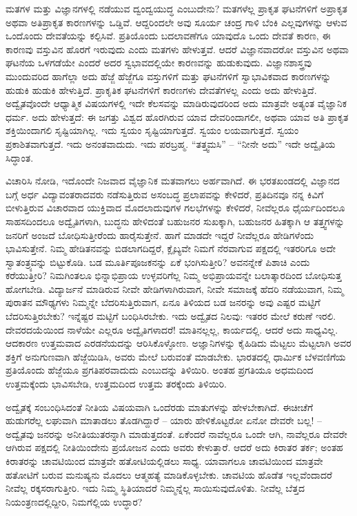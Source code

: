 ಮತಗಳ ಮತ್ತು ವಿಜ್ಞಾನಗಳಲ್ಲಿ ನಡೆಯುವ ದ್ವಂದ್ವಯುದ್ಧ ಎಂಬುದೇನು? ಮತಗಳೆಲ್ಲ ಪ್ರಾಕೃತ ಘಟನೆಗಳಿಗೆ ಅಪ್ರಾಕೃತ ಅಥವಾ ಅತಿಪ್ರಾಕೃತ ಕಾರಣಗಳನ್ನು ಒಡ್ಡಿವೆ. ಆದ್ದರಿಂದಲೇ ಅವು ಸೂರ್ಯ ಚಂದ್ರ ಗಾಳಿ ಬೆಂಕಿ ಎಲ್ಲವುಗಳನ್ನು ಆಳುವ ಒಂದೊಂದು ದೇವತೆಯನ್ನು ಕಲ್ಪಿಸಿವೆ. ಪ್ರತಿಯೊಂದು ಬದಲಾವಣೆಗೂ ಯಾವುದೊ ಒಂದು ದೇವತೆ ಕಾರಣ, ಈ ಕಾರಣವು ವಸ್ತುವಿನ ಹೊರಗೆ ಇರುವುದು ಎಂದು ಮತಗಳು ಹೇಳುತ್ತವೆ. ಆದರೆ ವಿಜ್ಞಾನವಾದರೋ ವಸ್ತುವಿನ ಅಥವಾ ಘಟನೆಯ ಒಳಗಡೆಯೇ ಎಂದರೆ ಅದರ ಸ್ವಭಾವದಲ್ಲಿಯೇ ಕಾರಣವನ್ನು ಹುಡುಕುವುದು. ವಿಜ್ಞಾನಶಾಸ್ತ್ರವು ಮುಂದುವರಿದ ಹಾಗೆಲ್ಲಾ ಅದು ಹೆಜ್ಜೆ ಹೆಜ್ಜೆಗೂ ವಸ್ತುಗಳಿಗೆ ಮತ್ತು ಘಟನೆಗಳಿಗೆ ಸ್ವಾಭಾವಿಕವಾದ ಕಾರಣಗಳನ್ನು ಹುಡುಕಿ ಹುಡುಕಿ ಹೇಳುತ್ತಿದೆ. ಪ್ರಾಕೃತಿಕ ಘಟನೆಗಳಿಗೆ ಕಾರಣಗಳು ದೇವತೆಗಳಲ್ಲ ಎಂದು ಅದು ಹೇಳುತ್ತಿದೆ. ಅದ್ವೈತವೊಂದೇ ಆಧ್ಯಾತ್ಮಿಕ ವಿಷಯಗಳಲ್ಲಿ ಇದೇ ಕೆಲಸವನ್ನು ಮಾಡಿರುವುದರಿಂದ ಅದು ಮಾತ್ರವೇ ಅತ್ಯಂತ ವೈಜ್ಞಾನಿಕ ಧರ್ಮ. ಅದು ಹೇಳುತ್ತದೆ: ಈ ಜಗತ್ತು ವಿಶ್ವದ ಹೊರಗಿರುವ ಯಾವ ದೇವರಿಂದಾಗಲೀ, ಅಥವಾ ಯಾವ ಅತಿ ಪ್ರಾಕೃತ ಶಕ್ತಿಯಿಂದಾಗಲಿ ಸೃಷ್ಟಿಯಾಗಿಲ್ಲ. ಇದು ಸ್ವಯಂ ಸೃಷ್ಟಿಯಾಗುತ್ತದೆ. ಸ್ವಯಂ ಲಯವಾಗುತ್ತದೆ. ಸ್ವಯಂ ಪ್ರಕಾಶಿತವಾಗುತ್ತದೆ. ಇದು ಅನಂತವಾದುದು. ಇದು ಪರಬ್ರಹ್ಮ. “ತತ್ತ್ವಮಸಿ” – “ನೀನೇ ಅದು” ಇದೇ ಅದ್ವೈತಿಯ ಸಿದ್ಧಾಂತ. 

ವಿಚಾರಿಸಿ ನೋಡಿ, ಇದೊಂದೇ ನಿಜವಾದ ವೈಜ್ಞಾನಿಕ ಮತವಾಗಲು ಅರ್ಹವಾಗಿದೆ. ಈ ಭರತಖಂಡದಲ್ಲಿ ವಿಜ್ಞಾನದ ಬಗ್ಗೆ ಅರ್ಧ ವಿದ್ಯಾವಂತರಾದವರು ನಡೆಸುತ್ತಿರುವ ಅಸಂಬದ್ಧ ಪ್ರಲಾಪವನ್ನು ಕೇಳಿದರೆ, ಪ್ರತಿದಿನವೂ ನನ್ನ ಕಿವಿಗೆ ಬೀಳುತ್ತಿರುವ ವಿಚಾರವಾದ ಯುಕ್ತಿವಾದ ಮೊದಲಾದುವುಗಳ ಗಲಭೆಗಳನ್ನು ಕೇಳಿದರೆ, ನೀವೆಲ್ಲರೂ ಧೈರ್ಯದಿಂದಲೂ ಸಾಹಸದಿಂದಲೂ ಅದ್ವೈತಿಗಳಾಗಿ, ಬುದ್ಧನು ಹೇಳಿದಂತೆ ಬಹುಜನರ ಸುಖಕ್ಕಾಗಿ, ಬಹುಜನರ ಹಿತಕ್ಕಾಗಿ ಆ ತತ್ತ್ವಗಳನ್ನು ಜನರಿಗೆ ಅಂಜದೆ ಬೋಧಿಸುತ್ತೀರೆಂದು ಹಾರೈಸುತ್ತೇನೆ. ಹಾಗೆ ಮಾಡದೇ ಇದ್ದರೆ ನೀವೆಲ್ಲರೂ ಹೇಡಿಗಳೆಂದು ಭಾವಿಸುತ್ತೇನೆ. ನಿಮ್ಮ ಹೇಡಿತನವನ್ನು ಬಿಡಲಾಗದಿದ್ದರೆ, ಕ್ಲೈಬ್ಯವೇ ನಿಮಗೆ ನೆರವಾಗುವ ಪಕ್ಷದಲ್ಲಿ ಇತರರಿಗೂ ಅದೇ ಸ್ವಾತಂತ್ರ್ಯವನ್ನು ಬಿಟ್ಟುಕೊಡಿ. ಬಡ ಮೂರ್ತಿಪೂಜಕನನ್ನು ಏಕೆ ಭಂಗಿಸುತ್ತೀರಿ? ಅವನನ್ನೇಕೆ ಪಿಶಾಚಿ ಎಂದು ಕರೆಯುತ್ತೀರಿ? ನಿಮಗಿಂತಲೂ ಭಿನ್ನಾಭಿಪ್ರಾಯ ಉಳ್ಳವರಿಗೆಲ್ಲ ನಿಮ್ಮ ಅಭಿಪ್ರಾಯವನ್ನೇ ಬಲಾತ್ಕಾರದಿಂದ ಬೋಧಿಸುತ್ತ ಹೋಗಬೇಡಿ. ವಿದ್ಯಾರ್ಜನೆ ಮಾಡಿರುವ ನೀವೇ ಹೇಡಿಗಳಾಗಿರುವಾಗ, ನೀವೇ ಸಮಾಜಕ್ಕೆ ಹೆದರಿ ನಡೆಯುವಾಗ, ನಿಮ್ಮ ಪುರಾತನ ಮೌಢ್ಯಗಳು ನಿಮ್ಮನ್ನೇ ಬೆದರಿಸುತ್ತಿರುವಾಗ, ಏನೂ ತಿಳಿಯದ ಬಡ ಜನರನ್ನು ಅವು ಎಷ್ಟರ ಮಟ್ಟಿಗೆ ಬೆದರಿಸುತ್ತಿರಬೇಕು? ಇನ್ನೆಷ್ಟರ ಮಟ್ಟಿಗೆ ಬಂಧಿಸಿರಬೇಕು. ಇದು ಅದ್ವೈತದ ನಿಲವು: ಇತರರ ಮೇಲೆ ಕರುಣೆ ಇರಲಿ. ದೇವರ\break ದಯೆಯಿಂದ ನಾಳೆಯೇ ಎಲ್ಲರೂ ಅದ್ವೈತಿಗಳಾದರೆ! ಮಾತಿನಲ್ಲಲ್ಲ, ಕಾರ್ಯದಲ್ಲಿ. ಆದರೆ ಅದು ಸಾಧ್ಯವಿಲ್ಲ. ಆದಕಾರಣ ಉತ್ತಮವಾದ ಎರಡನೆಯದನ್ನು ಆರಿಸಿಕೊಳ್ಳೋಣ. ಅಜ್ಞಾನಿಗಳನ್ನು ಕೈಹಿಡಿದು ಮೆಟ್ಟಲು ಮೆಟ್ಟಲಾಗಿ ಅವರ ಶಕ್ತಿಗೆ ಅನುಗುಣವಾಗಿ ಹೆಜ್ಜೆಯಿಡಿಸಿ, ಅವರು ಮೇಲೆ ಬರುವಂತೆ ಮಾಡಬೇಕು. ಭಾರತದಲ್ಲಿ ಧಾರ್ಮಿಕ ಬೆಳವಣಿಗೆಯ ಪ್ರತಿಯೊಂದು ಹೆಜ್ಜೆಯೂ ಪ್ರಗತಿಪರವಾದುದು ಎಂಬುದನ್ನು ತಿಳಿಯಿರಿ. ಅಂತಹ ಪ್ರಗತಿಯೂ ಅಧಮದಿಂದ ಉತ್ತಮಕ್ಕೆಂದು ಭಾವಿಸಬೇಡಿ, ಉತ್ತಮದಿಂದ ಉತ್ತಮ ತರಕ್ಕೆಂದು ತಿಳಿಯಿರಿ. 

ಅದ್ವೈತಕ್ಕೆ ಸಂಬಂಧಿಸಿದಂತೆ ನೀತಿಯ ವಿಷಯವಾಗಿ ಒಂದೆರಡು ಮಾತುಗಳನ್ನು ಹೇಳಬೇಕಾಗಿದೆ. ಈಚೀಚೆಗೆ ಹುಡುಗರೆಲ್ಲ ಲಘುವಾಗಿ ಮಾತಾಡಲು ತೊಡಗಿದ್ದಾರೆ – ಯಾರು ಹೇಳಿಕೊಟ್ಟರೋ ಏನೋ ದೇವರೇ ಬಲ್ಲ! – ಅದ್ವೈತವು ಜನರನ್ನು ಅನೀತಿಯುತರನ್ನಾಗಿ ಮಾಡುತ್ತದಂತೆ. ಏಕೆಂದರೆ ನಾವೆಲ್ಲರೂ ಒಂದೇ ಆಗಿ, ನಾವೆಲ್ಲರೂ ದೇವರೇ ಆಗಿರುವ ಪಕ್ಷದಲ್ಲಿ ನೀತಿಯಿಂದೇನು ಪ್ರಯೋಜನ ಎಂದು ಅವರು ಕೇಳುತ್ತಾರೆ. ಆದರೆ ಅದು ಕಿರಾತರ ತರ್ಕ; ಅಂತಹ ಕಿರಾತರನ್ನು ಚಾವಟಿಯಿಂದ ಮಾತ್ರವೇ ಹತೋಟಿಯಲ್ಲಿಡಲು ಸಾಧ್ಯ. ಯಾವಾಗಲೂ ಚಾವಟಿಯಿಂದ ಮಾತ್ರವೇ ಹತೋಟಿಗೆ ಬರುವ ಮನುಷ್ಯನು ಮೊದಲು ಆತ್ಮಹತ್ಯೆ ಮಾಡಿಕೊಳ್ಳಬೇಕು. ಚಾವಟಿಯ ಹೊಡೆತ ಇಲ್ಲವೆಂದಾದರೆ ನೀವೆಲ್ಲ ರಕ್ಕಸರಾಗುತ್ತೀರಿ. ಇದು ನಿಮ್ಮ ಸ್ಥಿತಿಯಾದರೆ ನಿಮ್ಮನ್ನೆಲ್ಲ ಸಾಯಿಸುವುದೊಳಿತು. ನೀವೆಲ್ಲ ಬೆತ್ತದ ನಿಯಂತ್ರಣದಲ್ಲಿದ್ದೀರಿ, ನಿಮಗೆಲ್ಲಿಯ ಉದ್ಧಾರ?

